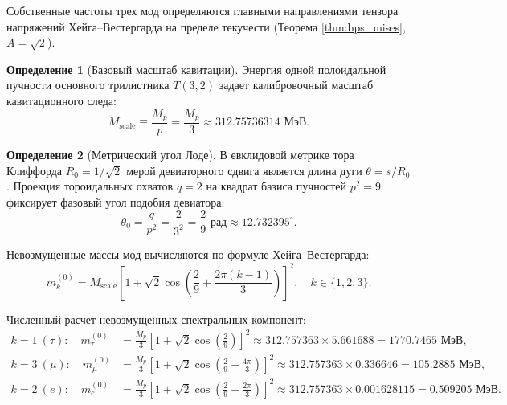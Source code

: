 \documentclass[11pt,a4paper]{article}
\theoremstyle{definition}
\newtheorem{definition}{Определение}
\theoremstyle{remark}
\begin{document}
Собственные частоты трех мод определяются главными направлениями тензора напряжений Хейга--Вестергарда на пределе текучести (Теорема \ref{thm:bps_mises}, $A = \sqrt{2}$).
	
\begin{definition}[Базовый масштаб кавитации]
Энергия одной полоидальной пучности основного трилистника $T(3,2)$ задает калибровочный масштаб кавитационного следа:
\begin{equation}
	M_{\mathrm{scale}} \equiv \frac{M_p}{p} = \frac{M_p}{3} \approx 312.75736314\text{ МэВ}.
\label{eq:m_scale_definition}
\end{equation}
\end{definition}
	
\begin{definition}[Метрический угол Лоде]
В евклидовой метрике тора Клиффорда $R_0 = 1/\sqrt{2}$ мерой девиаторного сдвига является длина дуги $\theta = s / R_0$. Проекция тороидальных охватов $q=2$ на квадрат базиса пучностей $p^2 = 9$ фиксирует фазовый угол подобия девиатора:
\begin{equation}
	\theta_0 = \frac{q}{p^2} = \frac{2}{3^2} = \frac{2}{9}\text{ рад} \approx 12.732395^\circ.
	\label{eq:lode_angle_exact}
\end{equation}
\end{definition}
	
Невозмущенные массы мод вычисляются по формуле Хейга--Вестергарда:
\begin{equation}
	m_k^{(0)} = M_{\mathrm{scale}} \left[ 1 + \sqrt{2} \cos\left( \frac{2}{9} + \frac{2\pi(k-1)}{3} \right) \right]^2, \quad k \in \{1, 2, 3\}.
	\label{eq:bare_lepton_masses}
\end{equation}
	
Численный расчет невозмущенных спектральных компонент:
\begin{align}
	k=1 \ (\tau): \quad m_\tau^{(0)} &= \frac{M_p}{3} \left[ 1 + \sqrt{2}\cos\left(\frac{2}{9}\right) \right]^2 \approx 312.757363 \times 5.661688 = 1770.7465\text{ МэВ}, \label{eq:tau_bare_calc} \\
	k=3 \ (\mu): \quad m_\mu^{(0)} &= \frac{M_p}{3} \left[ 1 + \sqrt{2}\cos\left(\frac{2}{9} + \frac{4\pi}{3}\right) \right]^2 \approx 312.757363 \times 0.336646 = 105.2885\text{ МэВ}, \label{eq:muon_bare_calc} \\
	k=2 \ (e): \quad m_e^{(0)} &= \frac{M_p}{3} \left[ 1 + \sqrt{2}\cos\left(\frac{2}{9} + \frac{2\pi}{3}\right) \right]^2 \approx 312.757363 \times 0.001628115 = 0.509205\text{ МэВ}. \label{eq:electron_bare_calc}
\end{align}
	
\end{document}
